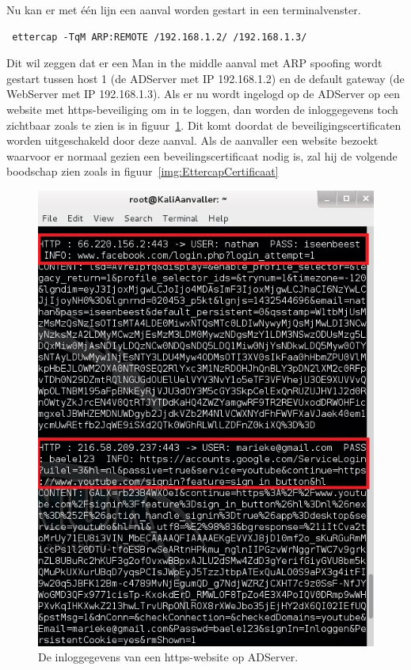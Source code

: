 \documentclass[pdftex,a4paper,12pt]{report}
\begin{document}
Nu kan er met één lijn een aanval worden gestart in een terminalvenster.
\begin{verbatim} ettercap -TqM ARP:REMOTE /192.168.1.2/ /192.168.1.3/ \end{verbatim}
Dit wil zeggen dat er een Man in the middle aanval met ARP spoofing wordt gestart tussen host 1 (de ADServer met IP 192.168.1.2) en de default gateway (de WebServer met IP 192.168.1.3). Als er nu wordt ingelogd op de ADServer op een website met https-beveiliging om in te loggen, dan worden de inloggegevens toch zichtbaar zoals te zien is in figuur~\ref{img:EttercapInlogHTTPS}. Dit komt doordat de beveiligingscertificaten worden uitgeschakeld door deze aanval. Als de aanvaller een website bezoekt waarvoor er normaal gezien een beveilingscertificaat nodig is, zal hij de volgende boodschap zien zoals in figuur~\ref{img:EttercapCertificaat} \citep{Canitank2009}

\begin{figure}[H]
\begin{center}
\includegraphics[scale=0.60]{img/EttercapInlogHTTPS}
\end{center}
\caption{De inloggegevens van een https-website op ADServer.}
\label{img:EttercapInlogHTTPS}
\end{figure}
\end{document}
